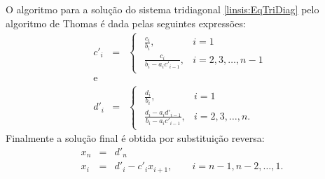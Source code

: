 O algoritmo para a solução do sistema tridiagonal \eqref{linsis:EqTriDiag} pelo algoritmo de Thomas é dada pelas seguintes expressões:
\begin{eqnarray}\label{linsis:TriDiag_1}
 c'_i &=&
\begin{cases}
\begin{array}{lcl}
  \frac{c_i}{b_i}                   , & i = 1 \\
  \frac{c_i}{b_i - a_i c'_{i - 1}}  , & i = 2, 3, \dots, n-1
\end{array}
\end{cases}\\
\text{e}\nonumber\\
d'_i &=&
\begin{cases}
\begin{array}{lcl}
  \frac{d_i}{b_i}                   , & i = 1 \\
  \frac{d_i - a_i d'_{i - 1}}{b_i - a_i c'_{i - 1}}  , & i = 2, 3, \dots, n.
\end{array}
\end{cases}
\end{eqnarray}
Finalmente a solução final é obtida por substituição reversa:
\begin{eqnarray}\label{linsis:TriDiag_2}
x_n &=& d'_n\\
 x_i &=& d'_i - c'_i x_{i + 1}, \qquad   i = n - 1, n - 2, \ldots, 1.
\end{eqnarray}

